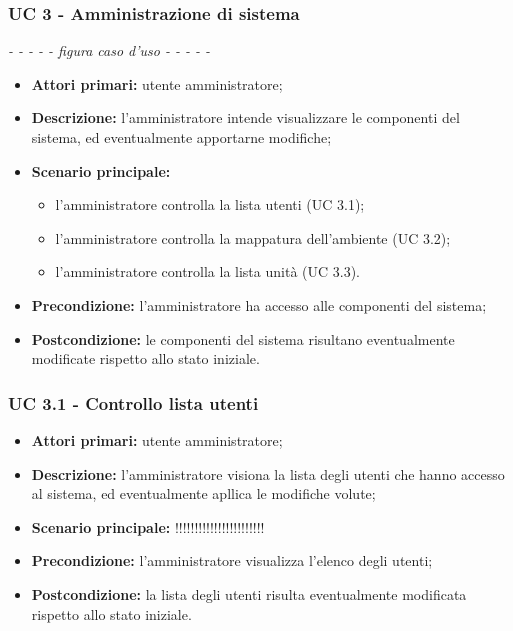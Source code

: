 \subsubsection{UC 3 - Amministrazione di sistema}
	\textit{- - - - - figura caso d'uso - - - - -}
	\begin{itemize}
		\item \textbf{Attori primari:} utente amministratore;
		\item \textbf{Descrizione:} l'amministratore intende visualizzare le componenti del sistema, ed eventualmente apportarne modifiche;
		\item \textbf{Scenario principale:} 
			\begin{itemize}
				\item l'amministratore controlla la lista utenti (UC 3.1);
				\item l'amministratore controlla la mappatura dell'ambiente (UC 3.2);
				\item l'amministratore controlla la lista unità (UC 3.3).
			\end{itemize}
		\item \textbf{Precondizione:} l'amministratore ha accesso alle componenti del sistema;
		\item \textbf{Postcondizione:} le componenti del sistema risultano eventualmente modificate rispetto allo stato iniziale.
	\end{itemize}
	
\subsubsection{UC 3.1 - Controllo lista utenti}
	\begin{itemize}
		\item \textbf{Attori primari:} utente amministratore;
		\item \textbf{Descrizione:} l'amministratore visiona la lista degli utenti che hanno accesso al sistema, ed eventualmente apllica le modifiche volute;
		\item \textbf{Scenario principale:} !!!!!!!!!!!!!!!!!!!!!!!
		\item \textbf{Precondizione:} l'amministratore visualizza l'elenco degli utenti;
		\item \textbf{Postcondizione:} la lista degli utenti risulta eventualmente modificata rispetto allo stato iniziale.
	\end{itemize}

